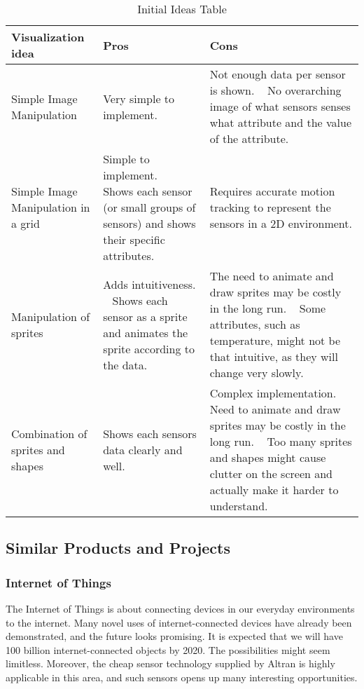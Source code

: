 \documentclass[../document]{subfiles}
\begin{document}
\begin{table}
\centering
\caption{Initial Ideas Table}
\begin{tabularx}{\textwidth}{|X|X|X|}
	\hline	
	Visualization idea
	&Pros
	&Cons
	\\ \hline Simple Image Manipulation
	&Very simple to implement.
	&Not enough data per sensor is shown.
	\newline \ \newline
	No overarching image of what sensors senses what attribute and the value of the attribute.
	\\ \hline Simple Image Manipulation in a grid
	&Simple to implement.
	\newline \ \newline
	Shows each sensor (or small groups of sensors) and shows their specific attributes.
	&Requires accurate motion tracking to represent the sensors in a 2D environment.
	\\ \hline Manipulation of sprites
	&Adds intuitiveness.
	\newline \ \newline
	Shows each sensor as a sprite and animates the sprite according to the data.
	&The need to animate and draw sprites may be costly in the long run.
	\newline \ \newline
	Some attributes, such as temperature, might not be that intuitive, as they will change very slowly. 
	\\ \hline Combination of sprites and shapes
	&Shows each sensors data clearly and well.
	&Complex implementation.
	\newline \ \newline
	Need to animate and draw sprites may be costly in the long run.
	\newline \ \newline
	Too many sprites and shapes might cause clutter on the screen and actually make it harder to understand.
	\\ \hline 
\end{tabularx}
\end{table}

\subsection{Similar Products and Projects}
\subsubsection{Internet of Things}
The Internet of Things is about connecting devices in our everyday environments to the internet. Many novel uses of internet-connected devices have already been demonstrated, and the future looks promising. It is expected that we will have 100 billion internet-connected objects by 2020. The possibilities might seem limitless. Moreover, the cheap sensor technology supplied by Altran is highly applicable in this area, and such sensors opens up many interesting opportunities.
\end{document}
